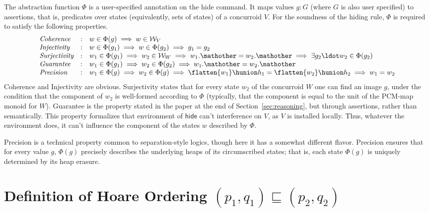 The abstraction function $\Phi$ is a user-specified annotation on the
hide command. It maps values $g : G$ (where $G$ is also user
specified) to assertions, that is, predicates over states
(equivalently, sets of states) of a concurroid $V$. For the soundness
of the hiding rule, $\Phi$ is required to satisfy the following
properties.  {\small
\[
\begin{array}[t]{lcl}
\textit{Coherence} & : & w \in \Phi(g) \implies w \in {\cal W}_V\\
\textit{Injectivity} & : & w \in \Phi(g_1) \implies w \in \Phi(g_2) \implies g_1 = g_2\\
\textit{Surjectivity} & : & w_1 \in \Phi(g_1) \implies w_2 \in {\cal W}_W \implies w_1.\mathother = w_2.\mathother \implies \exists g_2\ldot w_2 \in \Phi(g_2)\\
\textit{Guarantee} & : & w_1 \in \Phi(g_1) \implies w_2 \in \Phi(g_2) \implies w_1.\mathother = w_2.\mathother\\
\textit{Precision} & : & w_1 \in \Phi(g) \implies w_2 \in \Phi(g) \implies \flatten {w_1} \hunion h_1 = \flatten {w_2} \hunion h_2 \implies w_1 = w_2
\end{array}
\]}
Coherence and Injectivity are obvious. Surjectivity states that for
every state $w_2$ of the concurroid $W$ one can find an image $g$,
under the condition that the \other component of $w_2$ is well-formed
according to $\Phi$ (typically, that the \other component is equal to
the unit of the PCM-map monoid for $W$). Guarantee is the property
stated in the paper at the end of Section~\ref{sec:reasoning}, but
through assertions, rather than semantically. This property formalizes
that environment of $\mathsf{hide}$ can't interference on $V$, as $V$
is installed locally. Thus, whatever the environment does, it can't
influence the \other component of the states $w$ described by $\Phi$.

Precision is a technical property common to separation-style logics,
though here it has a somewhat different flavor. Precision ensures that
for every value $g$, $\Phi(g)$ precisely describes the underlying
heaps of its circumscribed states; that is, each state $\Phi(g)$ is
uniquely determined by its heap erasure.

\section{Definition of Hoare Ordering %
  $(p_1, q_1) \sqsubseteq (p_2, q_2)$}
\label{sec:ordering}

